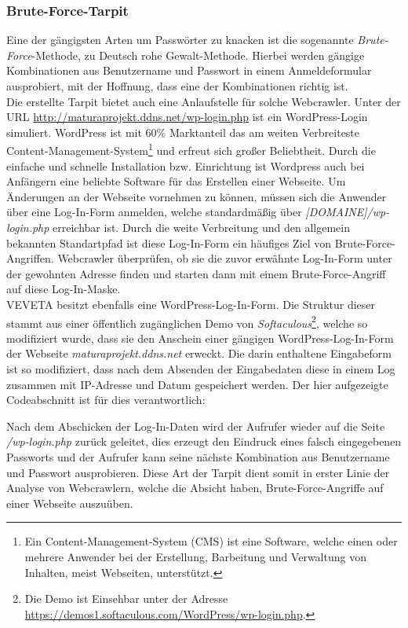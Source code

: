 \subsubsection{Brute-Force-Tarpit}
Eine der gängigsten  Arten um Passwörter zu knacken ist die sogenannte \emph{Brute-Force}-Methode, zu Deutsch \glqq rohe Gewalt\grqq-Methode. Hierbei werden gängige Kombinationen aus Benutzername und Passwort in einem Anmeldeformular ausprobiert, mit der Hoffnung, dass eine der Kombinationen richtig ist.\\
Die erstellte Tarpit bietet auch eine Anlaufstelle für solche Webcrawler. Unter der URL \url{http://maturaprojekt.ddns.net/wp-login.php} ist ein WordPress-Login simuliert. WordPress ist mit 60\% Marktanteil\cite{wordpress-verbreitung} das am weiten Verbreiteste Content-Management-System\footnote{Ein Content-Management-System (CMS) ist eine Software, welche einen oder mehrere Anwender bei der Erstellung, Barbeitung und Verwaltung von Inhalten, meist Webseiten, unterstützt.} und erfreut sich großer Beliebtheit. Durch die einfache und schnelle Installation bzw. Einrichtung ist Wordpress auch bei Anfängern eine beliebte Software für das Erstellen einer Webseite. Um Änderungen an der Webseite vornehmen zu können, müssen sich die Anwender über eine Log-In-Form anmelden, welche standardmäßig über \emph{[DOMAINE]/wp-login.php} erreichbar ist. Durch die weite Verbreitung und den allgemein bekannten Standartpfad ist diese Log-In-Form ein häufiges Ziel von Brute-Force-Angriffen. Webcrawler überprüfen, ob sie die zuvor erwähnte Log-In-Form unter der gewohnten Adresse finden und starten dann mit einem Brute-Force-Angriff auf diese Log-In-Maske.\\
VEVETA besitzt ebenfalls eine WordPress-Log-In-Form. Die Struktur dieser stammt aus einer öffentlich zugänglichen Demo von \emph{Softaculous}\footnote{Die Demo ist Einsehbar unter der Adresse \url{https://demos1.softaculous.com/WordPress/wp-login.php}.}, welche so modifiziert wurde, dass sie den Anschein einer gängigen WordPress-Log-In-Form der Webseite \emph{maturaprojekt.ddns.net} erweckt. Die darin enthaltene Eingabeform ist so modifiziert, dass nach dem Absenden der Eingabedaten diese in einem Log zusammen mit IP-Adresse und Datum gespeichert werden. Der hier aufgezeigte Codeabschnitt ist für dies verantwortlich:

Nach dem Abschicken der Log-In-Daten wird der Aufrufer wieder auf die Seite \emph{/wp-login.php} zurück geleitet, dies erzeugt den Eindruck eines falsch eingegebenen Passworts und der Aufrufer kann seine nächste Kombination aus Benutzername und Passwort ausprobieren. Diese Art der Tarpit dient somit in erster Linie der Analyse von Webcrawlern, welche die Absicht haben, Brute-Force-Angriffe auf einer Webseite auszuüben.
\label{subsub:brufe-force-tarpit}